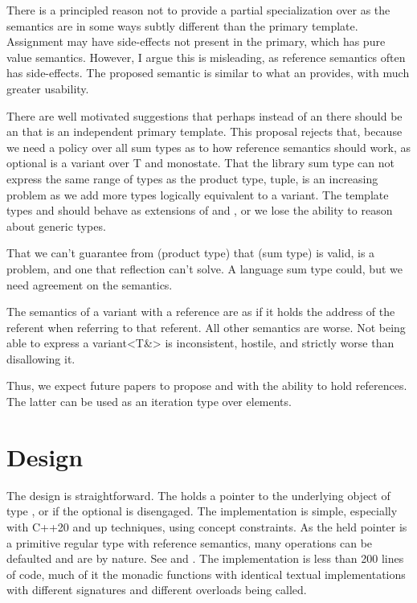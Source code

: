 \documentclass[a4paper,10pt,oneside,openany,final,article]{memoir}
\begin{document}
There is a principled reason not to provide a partial specialization over  as the semantics are in some ways subtly different than the primary template. Assignment may have side-effects not present in the primary, which has pure value semantics. However, I argue this is misleading, as reference semantics often has side-effects. The proposed semantic is similar to what an  provides, with much greater usability.

There are well motivated suggestions that perhaps instead of an  there should be an  that is an independent primary template. This proposal rejects that, because we need a policy over all sum types as to how reference semantics should work, as optional is a variant over T and monostate. That the library sum type can not express the same range of types as the product type, tuple, is an increasing problem as we add more types logically equivalent to a variant. The template types  and  should behave as extensions of  and , or we lose the ability to reason about generic types.

That we can't guarantee from  (product type) that  (sum type) is valid, is a problem, and one that reflection can't solve. A language sum type could, but we need agreement on the semantics.

The semantics of a variant with a reference are as if it holds the address of the referent when referring to that referent. All other semantics are worse. Not being able to express a variant<T\&> is inconsistent, hostile, and strictly worse than disallowing it.

Thus, we expect future papers to propose  and  with the ability to hold references.
The latter can be used as an iteration type over  elements.


\chapter{Design}

The design is straightforward. The  holds a pointer to the underlying object of type , or  if the optional is disengaged. The implementation is simple, especially with C++20 and up techniques, using concept constraints. As the held pointer is a primitive regular type with reference semantics, many operations can be defaulted and are  by nature. See \cite{Downey_smd_optional_optional_T} and \cite{rawgithu58:online}. The  implementation is less than 200 lines of code, much of it the monadic functions with identical textual implementations with different signatures and different overloads being called.
\end{document}
